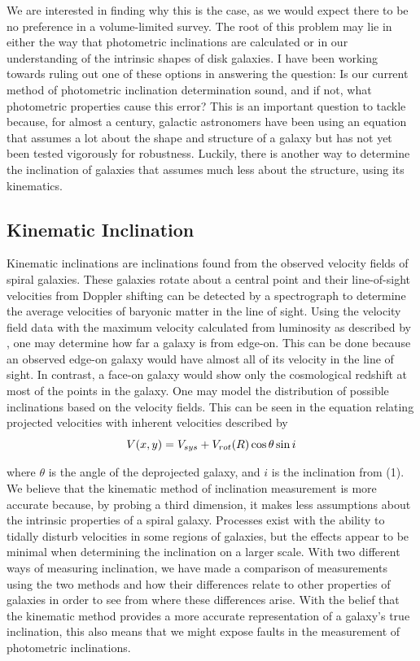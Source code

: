 \documentclass{emulateapj}
\begin{document}
\large We are interested in finding why this is the case, as we would expect there to be no preference in a volume-limited survey. The root of this problem may lie in either the way that photometric inclinations are calculated or in our understanding of the intrinsic shapes of disk galaxies. I have been working towards ruling out one of these options in answering the question: Is our current method of photometric inclination determination sound, and if not, what photometric properties cause this error? This is an important question to tackle because, for almost a century, galactic astronomers have been using an equation that assumes a lot about the shape and structure of a galaxy but has not yet been tested vigorously for robustness. Luckily, there is another way to determine the inclination of galaxies that assumes much less about the structure, using its kinematics.

\subsection{Kinematic Inclination}

\large Kinematic inclinations are inclinations found from the observed velocity fields of spiral galaxies. These galaxies rotate about a central point and their line-of-sight velocities from Doppler shifting can be detected by a spectrograph to determine the average velocities of baryonic matter in the line of sight. Using the velocity field data with the maximum velocity calculated from luminosity as described by \citet{tullyfish}, one may determine how far a galaxy is from edge-on. This can be done because an observed edge-on galaxy would have almost all of its velocity in the line of sight. In contrast, a face-on galaxy would show only the cosmological redshift at most of the points in the galaxy. One may model the distribution of possible inclinations based on the velocity fields. This can be seen in the equation relating projected velocities with inherent velocities described by \citet{teuben}
\begin{equation}
\large V(x,y) = V_{sys}+V_{rot}(R)\cos{\theta}\sin{i}
\end{equation}

\noindent \large where $\theta$ is the angle of the deprojected galaxy, and $i$ is the inclination from (1). We believe that the kinematic method of inclination measurement is more accurate because, by probing a third dimension, it makes less assumptions about the intrinsic properties of a spiral galaxy. Processes exist with the ability to tidally disturb velocities in some regions of galaxies, but the effects appear to be minimal when determining the inclination on a larger scale. With two different ways of measuring inclination, we have made a comparison of measurements using the two methods and how their differences relate to other properties of galaxies in order to see from where these differences arise. With the belief that the kinematic method provides a more accurate representation of a galaxy's true inclination, this also means that we might expose faults in the measurement of photometric inclinations.
\end{document}
